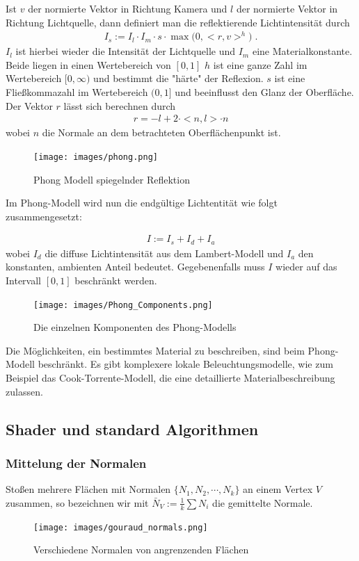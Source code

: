 Ist $v$ der normierte Vektor in Richtung Kamera und $l$ der normierte Vektor in Richtung Lichtquelle, dann definiert man die  reflektierende Lichtintensität durch
\begin{align}
I_s := I_l \cdot I_m \cdot s \cdot \max\biggl ( 0, <r,v>^h \biggr)\;.
\end{align}
$I_l$ ist hierbei wieder die Intensität der Lichtquelle und $I_m$ eine Materialkonstante. Beide liegen in einen Wertebereich von $[0,1]$ 
$h$ ist eine ganze Zahl im Wertebereich $[0, \infty)$ und bestimmt die "härte" der Reflexion. $s$ ist eine Fließkommazahl im Wertebereich $(0,1]$ und beeinflusst den Glanz der Oberfläche.
 Der Vektor $r$ lässt sich berechnen durch 
\begin{align}
r = -l + 2 \cdot <n, l> \cdot n
\end{align}
wobei $n$ die Normale an dem betrachteten Oberflächenpunkt ist.

\begin{figure}[H]
    \centering
    \texttt{[image: images/phong.png]}
    \caption{Phong Modell spiegelnder Reflektion}
    \label{fig:reflection-phong-specular-model}
\end{figure}

Im Phong-Modell wird nun die endgültige Lichtentität wie folgt zusammengesetzt:

\begin{align}
I := I_s + I_d + I_a
\end{align}
wobei $I_d$ die diffuse Lichtintensität aus dem Lambert-Modell und $I_a$ den konstanten, ambienten Anteil bedeutet.
Gegebenenfalls muss $I$ wieder auf das Intervall $[0,1]$ beschränkt werden.

\begin{figure}[H]
    \centering
    \texttt{[image: images/Phong\_Components.png]}
    \caption{Die einzelnen Komponenten des Phong-Modells}
    \label{fig:phong-components}\end{figure}

Die Möglichkeiten, ein bestimmtes Material zu beschreiben, sind  beim Phong-Modell beschränkt. 
Es gibt komplexere lokale Beleuchtungsmodelle, wie zum Beispiel das Cook-Torrente-Modell, die eine detaillierte Materialbeschreibung zulassen.




\subsection{Shader und standard Algorithmen}
\subsubsection{Mittelung der Normalen}
Stoßen mehrere Flächen mit Normalen $\{ N_1, N_2, \cdots, N_k \}$ an einem Vertex $V$ zusammen, so  bezeichnen wir  mit
$\bar{N}_V:= \frac{1}{k}\sum N_i$ die gemittelte Normale.
\begin{figure}[H]
    \centering
    \texttt{[image: images/gouraud\_normals.png]}
    \caption{Verschiedene Normalen von angrenzenden Flächen}
    \label{fig:gouraud-shading-scanline}
\end{figure}

